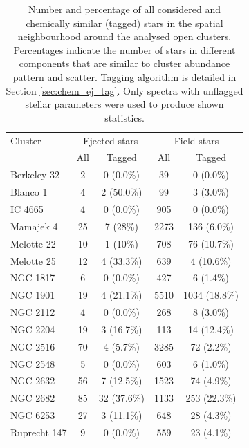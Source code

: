 \begin{table}
	\centering
	\caption{Number and percentage of all considered and chemically similar (tagged) stars in the spatial neighbourhood around the analysed open clusters. Percentages indicate the number of stars in different components that are similar to cluster abundance pattern and scatter. Tagging algorithm is detailed in Section \ref{sec:chem_ej_tag}. Only spectra with unflagged stellar parameters were used to produce shown statistics.}
	\begin{tabular}{l | c | c | c | c }
		\hline
		Cluster & \multicolumn{2}{c}{Ejected stars}  & \multicolumn{2}{c}{Field stars} \\
		 & All & Tagged & All & Tagged \\
		\hline
		Berkeley 32  & 2 & 0 (0.0\%) & 39 & 0 (0.0\%) \\ 
		Blanco 1     & 4 & 2 (50.0\%) & 99 & 3 (3.0\%) \\
		IC 4665      & 4 & 0 (0.0\%) & 905 & 0 (0.0\%) \\
		Mamajek 4    & 25 & 7 (28\%) & 2273 & 136 (6.0\%) \\
		Melotte 22   & 10 & 1 (10\%) & 708 & 76 (10.7\%) \\
		Melotte 25   & 12 & 4 (33.3\%) & 639 & 4 (10.6\%) \\
		NGC 1817     & 6 & 0 (0.0\%) & 427 & 6 (1.4\%) \\
		NGC 1901     & 19 & 4 (21.1\%) & 5510 & 1034 (18.8\%) \\
		NGC 2112     & 4 & 0 (0.0\%) & 268 & 8 (3.0\%) \\
		NGC 2204     & 19 & 3 (16.7\%) & 113 & 14 (12.4\%) \\
		NGC 2516     & 70 & 4 (5.7\%) & 3285 & 72 (2.2\%) \\
		NGC 2548     & 5 & 0 (0.0\%) & 603 & 6 (1.0\%) \\
		NGC 2632     & 56 & 7 (12.5\%) & 1523 & 74 (4.9\%) \\
		NGC 2682     & 85 & 32 (37.6\%) & 1133 & 253 (22.3\%) \\
		NGC 6253     & 27 & 3 (11.1\%) & 648 & 28 (4.3\%) \\
		Ruprecht 147 & 9 & 0 (0.0\%) & 559 & 23 (4.1\%) \\
		\hline
	\end{tabular}
	\label{tab:cluster_stats_abundtag}
\end{table}

